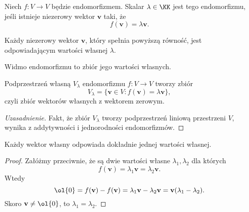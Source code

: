 \begin{definition}
    Niech $f : V \to V$ będzie endomorfizmem. Skalar $\lambda \in \KK$ jest  tego endomorfizmu, jeśli istnieje niezerowy wektor $\mathbf{v}$ taki, że
    \[ f(\mathbf{v}) = \lambda\mathbf{v}. \]

    Każdy niezerowy wektor $\mathbf{v}$, który spełnia powyższą równość, jest  odpowiadającym wartości własnej $\lambda$.
\end{definition}

\begin{definition}
    Widmo endomorfizmu to zbiór jego wartości własnych.
\end{definition}

\begin{definition}
    Podprzestrzeń własną $V_\lambda$ endomorfizmu $f : V \to V$ tworzy zbiór
    \[ V_\lambda = \{\mathbf{v} \in V : f(\mathbf{v}) = \lambda\mathbf{v}\}, \]
    czyli zbiór wektorów własnych z wektorem zerowym.
\end{definition}
\begin{proof}[Uzasadnienie]
    Fakt, że zbiór $V_\lambda$ tworzy podprzestrzeń liniową przestrzeni $V$, wynika z addytywności i jednorodności endomorfizmów.
\end{proof}

\begin{theorem}
    Każdy wektor własny odpowiada dokładnie jednej wartości własnej.
\end{theorem}
\begin{proof}
    Załóżmy przeciwnie, że są dwie wartości własne $\lambda_1, \lambda_2$ dla których
    \[ f(\mathbf{v}) = \lambda_1\mathbf{v} = \lambda_2\mathbf{v}. \]
    Wtedy
    \[ \ol{0} = f(\mathbf{v}) - f(\mathbf{v}) = \lambda_1\mathbf{v} - \lambda_2\mathbf{v} = \mathbf{v}(\lambda_1 - \lambda_2). \]
    Skoro $\mathbf{v} \neq \ol{0}$, to $\lambda_1 = \lambda_2$.
\end{proof}

